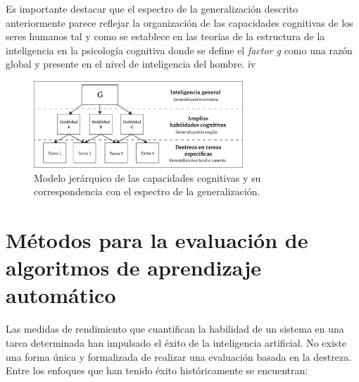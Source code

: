 Es importante destacar que el espectro de la generalización descrito anteriormente parece reflejar la organización de las capacidades cognitivas de los seres humanos tal y como se establece en las teorías de la estructura de la inteligencia en la psicología cognitiva donde se define el \textit{factor g} como una razón global y presente en el nivel de inteligencia del hombre. 
iv

\begin{figure}[ht!]
    \centering
    \includegraphics[width=0.7\textwidth]{Graphics/g-factor.png}
    \caption{Modelo jerárquico de las capacidades cognitivas y su correspondencia con el espectro de la generalización.}
    \label{fig:g-factor}
\end{figure}

\section{Métodos para la evaluación de algoritmos de aprendizaje automático}\label{section:state-of-the-art:evaluating-algoritms}

Las medidas de rendimiento que cuantifican la habilidad de un sistema en una tarea determinada han impulsado el éxito de la inteligencia artificial. No existe una forma única y formalizada de realizar una evaluación basada en la destreza. Entre los enfoques que han tenido éxito históricamente se encuentran:

